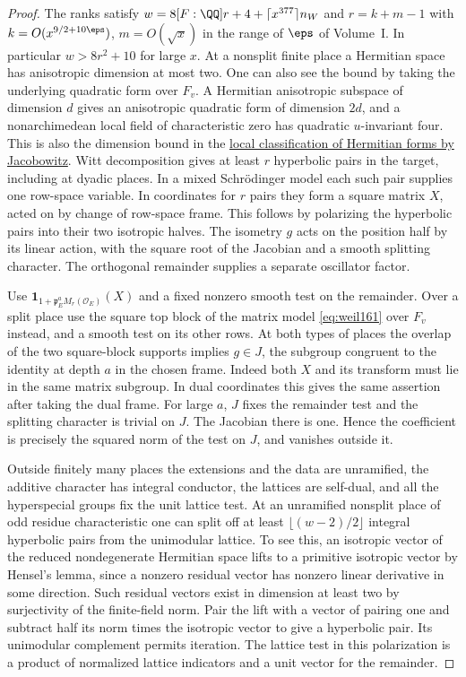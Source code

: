 \documentclass[a4paper,11pt]{article}
\theoremstyle{definition}
\theoremstyle{remark}
\numberwithin{equation}{section}
\newcommand{\OO}{\mathcal O}
\begin{document}
\begin{proof}
The ranks satisfy \(w=8[F:\QQ]r+4+\lceil x^{377}\rceil n_W\)
and \(r=k+m-1\) with \(k=O(x^{9/2+10\eps})\),
\(m=O(\sqrt x)\) in the range of \(\eps\) of Volume~I.
In particular \(w>8r^2+10\) for large \(x\).
At a nonsplit finite place a Hermitian space has anisotropic
dimension at most two. One can also see the bound by taking
the underlying quadratic form over \(F_v\). A Hermitian
anisotropic subspace of dimension \(d\) gives an anisotropic
quadratic form of dimension \(2d\), and a nonarchimedean
local field of characteristic zero has quadratic \(u\)-invariant
four. This is also the dimension bound in the
\href{https://doi.org/10.2307/2372982}{local classification of
Hermitian forms by Jacobowitz}. Witt decomposition gives at least \(r\)
hyperbolic pairs in the target, including at dyadic places.
In a mixed Schr\"odinger model each such pair supplies one
row-space variable. In coordinates for \(r\) pairs they form
a square matrix \(X\), acted on by change of row-space frame.
This follows by polarizing the hyperbolic pairs into their two
isotropic halves. The isometry \(g\) acts on the position
half by its linear action, with the square root of the
Jacobian and a smooth splitting character. The orthogonal
remainder supplies a separate oscillator factor.

Use \(\mathbf1_{1+\mathfrak p_E^aM_r(\OO_E)}(X)\) and a
fixed nonzero smooth test on the remainder. Over a split
place use the square top block of the matrix model
\eqref{eq:weil161} over \(F_v\) instead, and a smooth
test on its other rows. At both types of places the overlap
of the two square-block supports implies \(g\in J\), the
subgroup congruent to the identity at depth \(a\) in the
chosen frame. Indeed both \(X\) and its transform must lie
in the same matrix subgroup. In dual coordinates this gives
the same assertion after taking the dual frame. For large
\(a\), \(J\) fixes the remainder test and the splitting
character is trivial on \(J\). The Jacobian there is one.
Hence the coefficient is precisely the squared norm of the
test on \(J\), and vanishes outside it.

Outside finitely many places the extensions and the data are
unramified, the additive character has integral conductor,
the lattices are self-dual, and all the hyperspecial groups
fix the unit lattice test. At an unramified nonsplit place
of odd residue characteristic one can split off at least
\(\lfloor(w-2)/2\rfloor\) integral hyperbolic pairs from
the unimodular lattice. To see this, an isotropic vector of
the reduced nondegenerate Hermitian space lifts to a primitive
isotropic vector by Hensel's lemma, since a nonzero residual
vector has nonzero linear derivative in some direction.
Such residual vectors exist in dimension at least two by
surjectivity of the finite-field norm. Pair the lift with a
vector of pairing one and subtract half its norm times the
isotropic vector to give a hyperbolic pair. Its unimodular
complement permits iteration. The lattice test in this
polarization is a product of normalized lattice indicators
and a unit vector for the remainder.


\end{proof}
\end{document}
